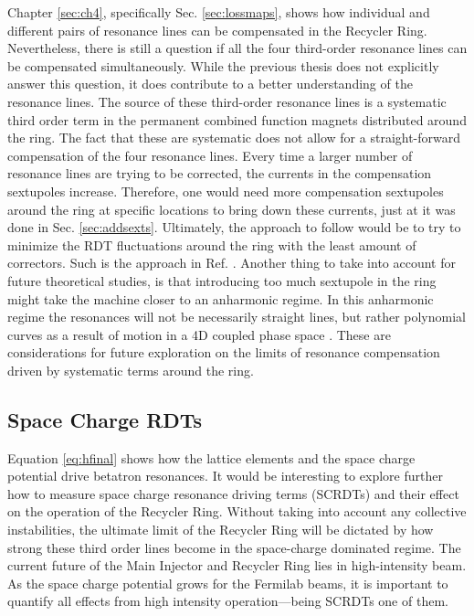 Chapter \ref{sec:ch4}, specifically Sec. \ref{sec:lossmaps}, shows how individual and different pairs of resonance lines can be compensated in the Recycler Ring. Nevertheless, there is still a question if all the four third-order resonance lines can be compensated simultaneously. While the previous thesis does not explicitly answer this question, it does contribute to a better understanding of the resonance lines. The source of these third-order resonance lines is a systematic third order term in the permanent combined function magnets distributed around the ring. The fact that these are systematic does not allow for a straight-forward compensation of the four resonance lines. Every time a larger number of resonance lines are trying to be corrected, the currents in the compensation sextupoles increase. Therefore, one would need more compensation sextupoles around the ring at specific locations to bring down these currents, just at it was done in Sec. \ref{sec:addsexts}. Ultimately, the approach to follow would be to try to minimize the RDT fluctuations around the ring with the least amount of correctors. Such is the approach in Ref. \cite{rdtfluct}. Another thing to take into account for future theoretical studies, is that introducing too much sextupole in the ring might take the machine closer to an anharmonic regime. In this anharmonic regime the resonances will not be necessarily straight lines, but rather polynomial curves as a result of motion in a 4D coupled phase space \cite{fixedlines1,fixedlines2}.  These are considerations for future exploration on the limits of resonance compensation driven by systematic terms around the ring.  

\subsection{Space Charge RDTs}

Equation \ref{eq:hfinal} shows how the lattice elements and the space charge potential drive betatron resonances. It would be interesting to explore further how to measure space charge resonance driving terms (SCRDTs) and their effect on the operation of the Recycler Ring. Without taking into account any collective instabilities, the ultimate limit of the Recycler Ring will be dictated by how strong these third order lines become in the space-charge dominated regime. The current future of the Main Injector and Recycler Ring lies in high-intensity beam. As the space charge potential grows for the Fermilab beams, it is important to quantify all effects from high intensity operation---being SCRDTs one of them.
